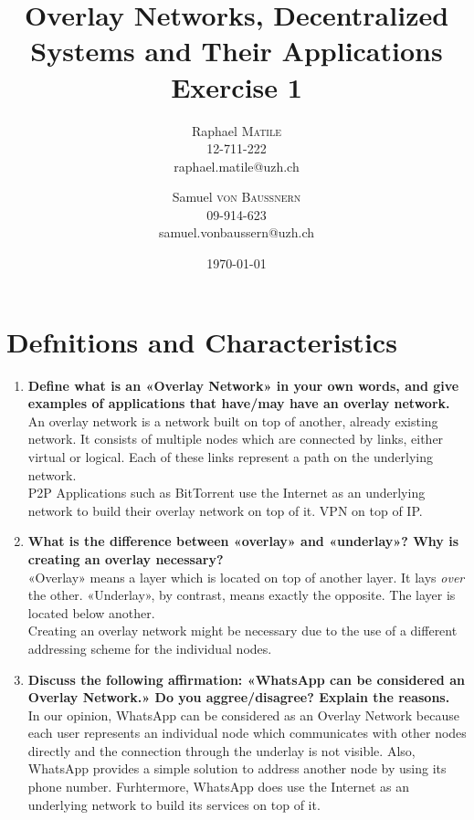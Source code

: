 \documentclass{article}
\title{Overlay Networks, Decentralized Systems and Their Applications\\Exercise 1} %
\author{Raphael \textsc{Matile}\\12-711-222\\raphael.matile@uzh.ch \and Samuel \textsc{von Baussnern}\\09-914-623\\samuel.vonbaussern@uzh.ch}
\date{\today} %
\begin{document}
\maketitle %

\section{Defnitions and Characteristics}
  \begin{enumerate}[1]
    \item \textbf{Define what is an «Overlay Network» in your own words, and give examples of applications that have/may have an overlay network.} \\
            An overlay network is a network built on top of another, 
            already existing network. It consists of multiple nodes which 
            are connected by links, either virtual or logical. 
            Each of these links represent a path on the underlying network. \\
            P2P Applications such as BitTorrent use the Internet as an underlying network to build their overlay network on top of it. VPN on top of IP.
    \item \textbf{What is the difference between «overlay» and «underlay»? Why is creating an overlay necessary?} \\
            «Overlay» means a layer which is located on top of another layer. 
            It lays \textit{over} the other. «Underlay», by contrast, means exactly the opposite. 
            The layer is located below another. \\
            Creating an overlay network might be necessary due to the use of a different addressing scheme for the individual nodes.
    \item \textbf{Discuss the following affirmation: «WhatsApp can be considered an Overlay Network.» Do you aggree/disagree? Explain the reasons.} \\
            In our opinion, WhatsApp can be considered as an Overlay Network because each user represents an individual node which 
            communicates with other nodes directly and the connection through the underlay is not visible. Also, WhatsApp provides a simple solution to address another node by using its phone number.
            Furhtermore, WhatsApp does use the Internet as an underlying network to build its services on top of it.
  \end{enumerate}
\end{document}
